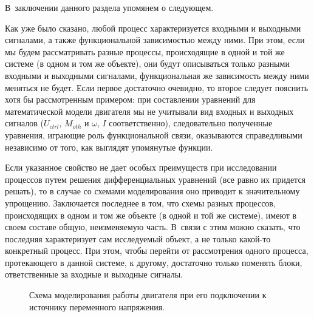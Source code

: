 \documentclass[12pt, a4paper, openany]{extarticle}
\begin{document}
В~заключении данного раздела упомянем о следующем.

Как уже было сказано, любой процесс характеризуется входными и выходными сигналами, а также функциональной зависимостью между ними. 
При этом, если мы будем рассматривать разные процессы, происходящие в одной и той же системе (в одном и том же объекте), они будут описываться только разными входными и выходными сигналами, функциональная же зависимость между ними меняться не будет.
Если первое достаточно очевидно, то второе следует пояснить хотя бы рассмотренным примером: при составлении уравнений для математической модели двигателя мы не учитывали вид входных и выходных сигналов ($U_{ctrl}$, $M_{oth}$ и $\omega$, $I$ соответственно), следовательно полученные уравнения, играющие роль функциональной связи, оказываются справедливыми независимо от того, как выглядят упомянутые функции.

Если указанное свойство не дает особых преимуществ при исследовании процессов путем решения дифференциальных уравнений (все равно их придется решать), то в случае со  схемами моделирования оно приводит к значительному упрощению.
Заключается последнее в том, что схемы разных процессов, происходящих в одном и том же объекте (в одной и той же системе), имеют в своем составе общую, неизменяемую часть.
В~связи с этим можно сказать, что последняя характеризует сам исследуемый объект, а не только какой-то конкретный процесс.
При этом, чтобы перейти от рассмотрения одного процесса, протекающего в данной системе, к другому, достаточно только поменять блоки, ответственные за входные и выходные сигналы.

\begin{figure}[h]
	\noindent{}
	\caption{Схема моделирования работы двигателя при его подключении к источнику переменного напряжения.}
	\label{struct_sheme_for_sin}
\end{figure}
\end{document}
